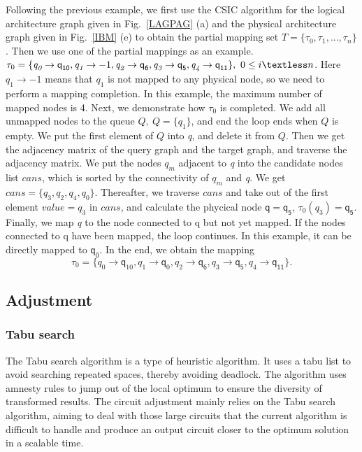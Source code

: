 \documentclass[runningheads]{llncs}
\begin{document}
\begin{example}
	Following the previous example, we first use the CSIC algorithm for the logical architecture graph given in Fig.~\ref{LAGPAG} (a) and the physical architecture graph given in Fig.~\ref{IBM} (e) to obtain the partial mapping set $T=\{\tau_{0},\tau_{1},...,\tau_{n}\}$. Then we use one of the partial mappings as an example.
	$\tau_{0}=\{\textit{q}_\textit{0}\rightarrow \textsf{q}_{\textsf{10}},\textit{q}_\textit{1}\rightarrow -1,
	\textit{q}_\textit{2}\rightarrow \textsf{q}_{\textsf{6}},\textit{q}_\textit{3}\rightarrow \textsf{q}_{\textsf{5}},\textit{q}_\textit{4}\rightarrow \textsf{q}_{\textsf{11}}\}, \ 0 \le i \textless n$. 
Here $\textit{q}_\textit{1}\rightarrow -1$ means that $\textit{q}_\textit{1}$ is not mapped to any physical node, so we need to perform a mapping completion. In this example, the maximum number of mapped nodes is 4. Next, we demonstrate how $\tau_{0}$ is completed. We add all unmapped nodes to the queue $Q, \ Q=\{\textit{q}_\textit{1}\}$, and end the loop ends when $Q$ is empty. We put the first element of $Q$ into \textit{q}, and delete it from $Q$.  
Then we get the adjacency matrix of the query graph and the target graph, and traverse the adjacency matrix. We put the nodes  $\textit{q}_\textit{m}$ adjacent to \textit{q} into the candidate nodes list $cans$, which is sorted by the connectivity of $\textit{q}_\textit{m}$ and \textit{q}. We get $cans=\{\textit{q}_\textit{3},\textit{q}_\textit{2},\textit{q}_\textit{4},\textit{q}_\textit{0}\}$. Thereafter, we traverse $cans$ and take out of the first element $value=\textit{q}_\textit{3}$ in $cans$, and calculate the phycical node $\textsf{q}=\textsf{q}_{\textsf{5}}$, $\tau_0(\textit{q}_\textit{3})=\textsf{q}_{\textsf{5}}$. Finally, we map \textit{q} to the node connected to \textsf{q} but not yet mapped. If the nodes connected to \textsf{q} have been mapped, the loop continues. In this example, it can be directly mapped to $\textsf{q}_{\textsf{0}}$. In the end, we obtain the mapping $$ \tau_{0}=\{\textit{q}_\textit{0}\rightarrow  \textsf{q}_{10},\textit{q}_\textit{1}\rightarrow \textsf{q}_{0},	\textit{q}_\textit{2}\rightarrow  \textsf{q}_{\textsf{6}},\textit{q}_\textit{3}\rightarrow  \textsf{q}_{\textsf{5}},\textit{q}_\textit{4}\rightarrow  \textsf{q}_{\textsf{11}}\}. $$
	\end{example}
\subsection{Adjustment}
\subsubsection{Tabu search}
The Tabu search algorithm is a type of heuristic algorithm. It uses a tabu list to avoid searching repeated spaces, thereby avoiding deadlock. The algorithm uses amnesty rules to jump out of the local optimum to ensure the diversity of transformed results. The circuit adjustment mainly relies on the Tabu search algorithm, aiming to deal with those large circuits that the current algorithm is difficult to handle and produce an output circuit closer to the optimum solution in a scalable time.
\end{document}
